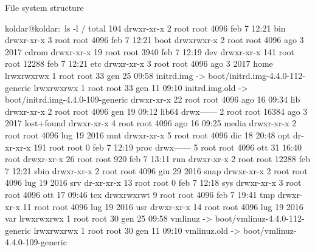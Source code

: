\begin{frame}[fragile]{File system structure}

\begin{verbbox}
koldar@koldar:~\textdollar ls -l /
total 104
drwxr-xr-x   2 root root  4096 feb  7 12:21 bin
drwxr-xr-x   3 root root  4096 feb  7 12:21 boot
drwxrwxr-x   2 root root  4096 ago  3  2017 cdrom
drwxr-xr-x  19 root root  3940 feb  7 12:19 dev
drwxr-xr-x 141 root root 12288 feb  7 12:21 etc
drwxr-xr-x   3 root root  4096 ago  3  2017 home
lrwxrwxrwx   1 root root    33 gen 25 09:58 initrd.img -> boot/initrd.img-4.4.0-112-generic
lrwxrwxrwx   1 root root    33 gen 11 09:10 initrd.img.old -> boot/initrd.img-4.4.0-109-generic
drwxr-xr-x  22 root root  4096 ago 16 09:34 lib
drwxr-xr-x   2 root root  4096 gen 19 09:12 lib64
drwx------   2 root root 16384 ago  3  2017 lost+found
drwxr-xr-x   4 root root  4096 ago 16 09:25 media
drwxr-xr-x   2 root root  4096 lug 19  2016 mnt
drwxr-xr-x   5 root root  4096 dic 18 20:48 opt
dr-xr-xr-x 191 root root     0 feb  7 12:19 proc
drwx------   5 root root  4096 ott 31 16:40 root
drwxr-xr-x  26 root root   920 feb  7 13:11 run
drwxr-xr-x   2 root root 12288 feb  7 12:21 sbin
drwxr-xr-x   2 root root  4096 giu 29  2016 snap
drwxr-xr-x   2 root root  4096 lug 19  2016 srv
dr-xr-xr-x  13 root root     0 feb  7 12:18 sys
drwxr-xr-x   3 root root  4096 ott 17 09:46 tex
drwxrwxrwt   9 root root  4096 feb  7 19:41 tmp
drwxr-xr-x  11 root root  4096 lug 19  2016 usr
drwxr-xr-x  14 root root  4096 lug 19  2016 var
lrwxrwxrwx   1 root root    30 gen 25 09:58 vmlinuz -> boot/vmlinuz-4.4.0-112-generic
lrwxrwxrwx   1 root root    30 gen 11 09:10 vmlinuz.old -> boot/vmlinuz-4.4.0-109-generic
\end{verbbox}
\scalebox{0.55}{
	\fbox{\theverbbox[t]}%
}

\end{frame}